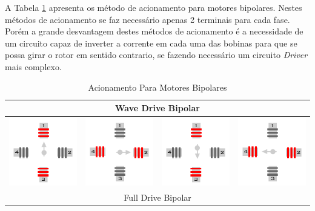 A Tabela \ref{Table:AcionamentoBipolar} apresenta os método de acionamento para motores bipolares. Nestes métodos de acionamento se faz necessário apenas 2 terminais para cada fase. Porém a grande desvantagem destes métodos de acionamento é a necessidade de um circuito capaz de inverter a corrente em cada uma das bobinas para que se possa girar o rotor em sentido contrario, se fazendo necessário um circuito \emph{Driver} mais complexo. 

\begin{table}[H]
	\centering
	\caption{Acionamento Para Motores Bipolares}
	\label{Table:AcionamentoBipolar}
	\begin{tabular}{|cccc|}
		\hline
		\multicolumn{4}{|c|}{Wave Drive Bipolar}  \\
		\hline
		\includegraphics[width = 0.15\columnwidth]{Images/AcionamentoDoHSM/Bipolar/WaveDrive/WaveDriveI.png} & \includegraphics[width = 0.15\columnwidth]{Images/AcionamentoDoHSM/Bipolar/WaveDrive/WaveDriveII.png} & \includegraphics[width = 0.15\columnwidth]{Images/AcionamentoDoHSM/Bipolar/WaveDrive/WaveDriveIII.png} & \includegraphics[width = 0.15\columnwidth]{Images/AcionamentoDoHSM/Bipolar/WaveDrive/WaveDriveIV.png} \\
		\hline
		\multicolumn{4}{|c|}{Full Drive Bipolar}  \\
		\hline

\end{tabular}
\end{table}
